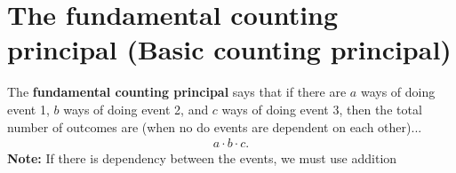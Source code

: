 \documentclass{report}
\begin{document}
    \section{\LARGE The fundamental counting principal (Basic counting principal)}
    \bigbreak \noindent 
    \smallbreak \noindent
    \begin{definition}
        The \textbf{fundamental counting principal} says that if there are $a$ ways of doing event 1, $b$ ways of doing event 2, and $c$ ways of doing event 3, then the total number of outcomes are (when no do events are dependent on each other)...
        \begin{align*}
            a \cdot b \cdot c
        .\end{align*}
        \bigbreak \noindent 
        \textbf{Note:} If there is dependency between the events, we must use addition
    \end{definition}

    
\end{document}
